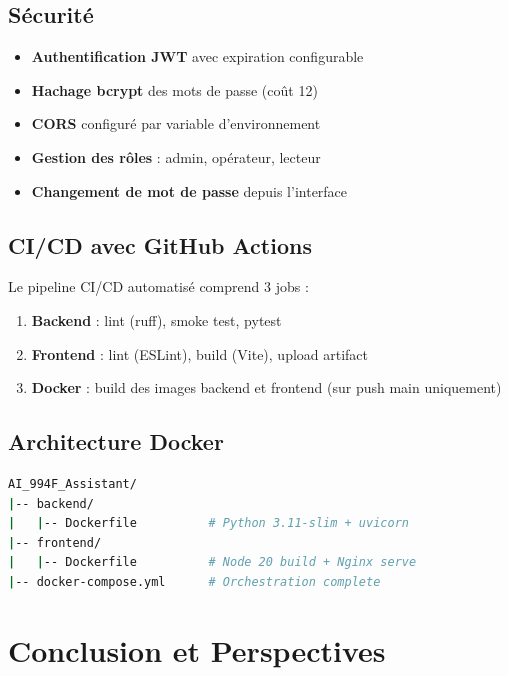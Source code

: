 \documentclass[12pt,a4paper]{report}
\begin{document}
\section{Sécurité}

\begin{itemize}
  \item \textbf{Authentification JWT} avec expiration configurable
  \item \textbf{Hachage bcrypt} des mots de passe (coût 12)
  \item \textbf{CORS} configuré par variable d'environnement
  \item \textbf{Gestion des rôles} : admin, opérateur, lecteur
  \item \textbf{Changement de mot de passe} depuis l'interface
\end{itemize}

\section{CI/CD avec GitHub Actions}

Le pipeline CI/CD automatisé comprend 3 jobs :

\begin{enumerate}
  \item \textbf{Backend} : lint (ruff), smoke test, pytest
  \item \textbf{Frontend} : lint (ESLint), build (Vite), upload artifact
  \item \textbf{Docker} : build des images backend et frontend (sur push main uniquement)
\end{enumerate}

\section{Architecture Docker}

\begin{lstlisting}[language=bash, caption={Structure Docker du projet}]
AI_994F_Assistant/
|-- backend/
|   |-- Dockerfile          # Python 3.11-slim + uvicorn
|-- frontend/
|   |-- Dockerfile          # Node 20 build + Nginx serve
|-- docker-compose.yml      # Orchestration complete
\end{lstlisting}

\chapter{Conclusion et Perspectives}
\end{document}

